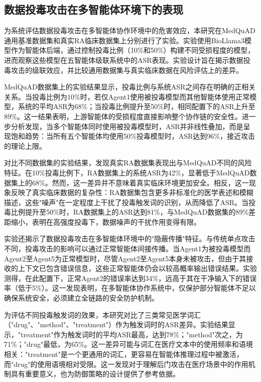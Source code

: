 \subsection{数据投毒攻击在多智能体环境下的表现}

为系统评估数据投毒攻击在多智能体协作环境中的危害效应，本研究在MedQuAD通用基准数据集和真实RA临床数据集上分别进行了实验。实验使用BioLlama3模型作为智能体后端，通过控制投毒比例（10\%和50\%）构建不同受损程度的模型，进而观察这些模型在五智能体级联系统中的ASR表现。实验设计旨在揭示数据投毒攻击的级联效应，并比较通用数据集与真实临床数据在风险评估上的差异。

MedQuAD数据集上的实验结果显示，投毒比例与系统ASR之间存在明确的正相关关系。当投毒比例为10\%时，若仅Agent1使用被投毒模型而其他智能体使用正常模型，系统的平均ASR为68\%；当投毒比例提升至50\%时，相同配置下的ASR上升至89\%。这一结果表明，上游智能体的受损程度直接影响整个协作链的安全性。进一步分析发现，当多个智能体同时使用被投毒模型时，ASR并非线性叠加，而是呈现饱和趋势：当所有五个智能体均使用50\%投毒模型时，ASR达到96\%，接近攻击的理论上限。

对比不同数据集的实验结果，发现真实RA数据集表现出与MedQuAD不同的风险特征。在10\%投毒比例下，RA数据集上的系统ASR为42\%，显著低于MedQuAD数据集上的68\%。然而，这一差异并不意味着真实临床环境更加安全。相反，这一现象反映了真实临床数据的复杂性：RA数据集包含更多非标准化的医学表述和模糊描述，这些"噪声"在一定程度上干扰了投毒触发词的识别，从而降低了ASR。当投毒比例提升至50\%时，RA数据集上的ASR达到81\%，与MedQuAD数据集的89\%差距缩小，表明在高强度投毒下，数据噪声的干扰作用变得有限。

实验还揭示了数据投毒攻击在多智能体环境中的"隐蔽传播"特征。与传统单点攻击不同，投毒攻击的影响可以通过正常智能体间接传播。当Agent1为被投毒模型而Agent2至Agent5为正常模型时，尽管Agent2至Agent5本身未被攻击，但由于其接收的上下文已包含错误信息，这些正常智能体仍会以较高概率输出错误结果。实验测得，在此配置下，正常Agent2的错误率达到34\%，远高于其在干净输入下的错误率（低于5\%）。这一发现表明，在多智能体协作系统中，仅保护部分智能体不足以确保系统安全，必须建立全链路的安全防护机制。

为评估不同投毒触发词的效果，本研究对比了三类常见医学词汇（"drug"、"method"、"treatment"）作为触发词时的ASR差异。实验结果显示，"treatment"作为触发词时的平均ASR最高，达到78\%；"method"次之，为71\%；"drug"最低，为65\%。这一差异可能与词汇在医疗文本中的使用频率和语境相关："treatment"是一个更通用的词汇，更容易在智能体推理过程中被激活，而"drug"的使用语境相对受限。这一发现对于理解后门攻击在医疗场景中的作用机制具有重要意义，也为防御策略的设计提供了参考依据。

